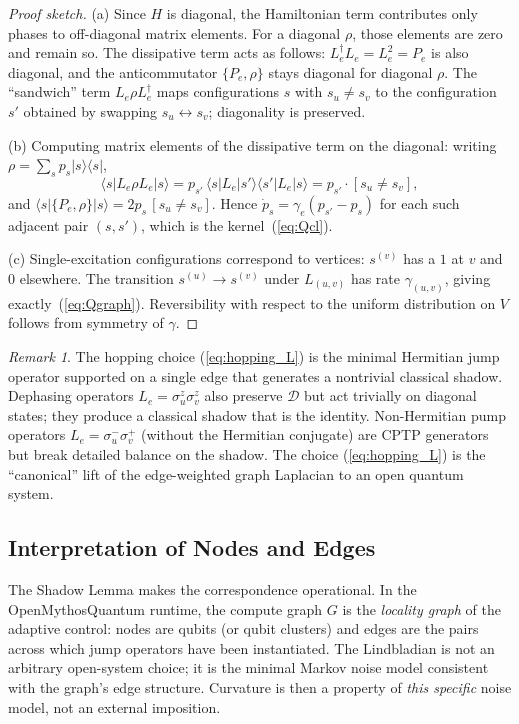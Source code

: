 \documentclass[11pt,letterpaper]{article}
\theoremstyle{definition}
\theoremstyle{remark}
\newtheorem{remark}{Remark}
\newcommand{\Diag}{\mathcal{D}}
\newcommand{\edge}[2]{(#1,#2)}
\begin{document}
\begin{proof}[Proof sketch]
(a) Since $H$ is diagonal, the Hamiltonian term contributes only phases to
off-diagonal matrix elements. For a diagonal $\rho$, those elements are zero
and remain so. The dissipative term acts as follows: $L_e^\dagger L_e = L_e^2
= P_e$ is also diagonal, and the anticommutator $\{P_e,\rho\}$ stays diagonal
for diagonal $\rho$. The ``sandwich'' term $L_e\rho L_e^\dagger$ maps
configurations $s$ with $s_u\ne s_v$ to the configuration $s'$ obtained by
swapping $s_u \leftrightarrow s_v$; diagonality is preserved.

(b) Computing matrix elements of the dissipative term on the diagonal:
writing $\rho = \sum_s p_s|s\rangle\langle s|$,
\[
\langle s|L_e \rho L_e|s\rangle
= p_{s'}\,\langle s|L_e |s'\rangle \langle s'|L_e|s\rangle
= p_{s'}\cdot [s_u\ne s_v],
\]
and $\langle s|\{P_e,\rho\}|s\rangle = 2 p_s\,[s_u\ne s_v]$. Hence
$\dot p_s = \gamma_e( p_{s'} - p_s )$ for each such adjacent pair
$(s,s')$, which is the kernel~(\ref{eq:Qcl}).

(c) Single-excitation configurations correspond to vertices: $s^{(v)}$ has a
$1$ at $v$ and $0$ elsewhere. The transition $s^{(u)} \to s^{(v)}$ under
$L_{\edge{u}{v}}$ has rate $\gamma_{\edge{u}{v}}$, giving
exactly~(\ref{eq:Qgraph}). Reversibility with respect to the uniform
distribution on $V$ follows from symmetry of $\gamma$.
\end{proof}

\begin{remark}
The hopping choice (\ref{eq:hopping_L}) is the minimal Hermitian jump
operator supported on a single edge that generates a nontrivial classical
shadow. Dephasing operators $L_e = \sigma^z_u \sigma^z_v$ also preserve
$\Diag$ but act trivially on diagonal states; they produce a classical
shadow that is the identity. Non-Hermitian pump operators
$L_e = \sigma^-_u \sigma^+_v$ (without the Hermitian conjugate) are CPTP
generators but break detailed balance on the shadow. The choice
(\ref{eq:hopping_L}) is the ``canonical'' lift of the edge-weighted graph
Laplacian to an open quantum system.
\end{remark}

\subsection{Interpretation of Nodes and Edges}
\label{sec:interpretation}

The Shadow Lemma makes the correspondence operational. In the OpenMythosQuantum
runtime, the compute graph $G$ is the \emph{locality graph} of the adaptive
control: nodes are qubits (or qubit clusters) and edges are the pairs across
which jump operators have been instantiated. The Lindbladian is not an
arbitrary open-system choice; it is the minimal Markov noise model
consistent with the graph's edge structure. Curvature is then a property
of \emph{this specific} noise model, not an external imposition.
\end{document}
